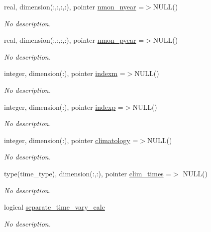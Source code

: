 \begin{DoxyCompactItemize}
real, dimension(\+:,\+:,\+:,\+:), pointer \hyperlink{structinterpolator__mod_1_1interpolate__type_ab8ee99b5abce68cb89b89921cad4615e}{nmon\+\_\+nyear} =$>$N\+U\+LL()
\begin{DoxyCompactList}\small\item\em No description. \end{DoxyCompactList}\item 
real, dimension(\+:,\+:,\+:,\+:), pointer \hyperlink{structinterpolator__mod_1_1interpolate__type_a868f55c1d2e4a978ef6b544c1ebaa61f}{nmon\+\_\+pyear} =$>$N\+U\+LL()
\begin{DoxyCompactList}\small\item\em No description. \end{DoxyCompactList}\item 
integer, dimension(\+:), pointer \hyperlink{structinterpolator__mod_1_1interpolate__type_a0cd8d140914a66872498299f16f88599}{indexm} =$>$N\+U\+LL()
\begin{DoxyCompactList}\small\item\em No description. \end{DoxyCompactList}\item 
integer, dimension(\+:), pointer \hyperlink{structinterpolator__mod_1_1interpolate__type_aacfd7db8972fa74b2ac1c925b06a5750}{indexp} =$>$N\+U\+LL()
\begin{DoxyCompactList}\small\item\em No description. \end{DoxyCompactList}\item 
integer, dimension(\+:), pointer \hyperlink{structinterpolator__mod_1_1interpolate__type_a7e69d0cea8c2da152768794faf331ca7}{climatology} =$>$N\+U\+LL()
\begin{DoxyCompactList}\small\item\em No description. \end{DoxyCompactList}\item 
type(time\+\_\+type), dimension(\+:,\+:), pointer \hyperlink{structinterpolator__mod_1_1interpolate__type_adb46f9ffb550fcecd7790530e5f1f083}{clim\+\_\+times} =$>$ N\+U\+LL()
\begin{DoxyCompactList}\small\item\em No description. \end{DoxyCompactList}\item 
logical \hyperlink{structinterpolator__mod_1_1interpolate__type_a8970892896a81150bbb88c4e8aa1c585}{separate\+\_\+time\+\_\+vary\+\_\+calc}
\begin{DoxyCompactList}\small\item\em No description. \end{DoxyCompactList}\item 

\end{DoxyCompactItemize}
